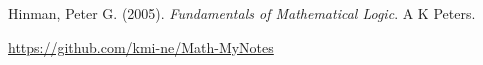 \documentclass[autodetect-engine, ja=standard, base=9pt, b5j, english]{bxjsreport} %
\begin{document}
Hinman, Peter G. (2005). \textit{Fundamentals of Mathematical Logic}. A K Peters.

\url{https://github.com/kmi-ne/Math-MyNotes}


\end{document}
